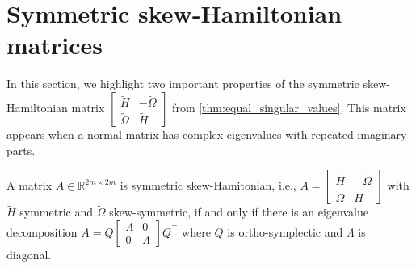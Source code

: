 \documentclass[10pt,twoside,dvipsnames]{siamart1116}
\numberwithin{algorithm}{section}
\numberwithin{equation}{section}
\begin{document}
	\section{Symmetric skew-Hamiltonian matrices}\label{app:sym_skew_hamiltonian} In this section, we highlight two important properties of the symmetric skew-Hamiltonian matrix $\left[\begin{smallmatrix}
	\widetilde{H}&-\widetilde{\Omega}\\
	\widetilde{\Omega}&\widetilde{H}
	\end{smallmatrix}\right]$ from \cref{thm:equal_singular_values}. This matrix appears when a normal matrix has complex eigenvalues with repeated imaginary parts.
	\begin{lemma}\label{lem:symplectic_vectors}
	A matrix $A\in\mathbb{R}^{2m\times 2m}$ is symmetric skew-Hamitonian, i.e., $A=\left[\begin{smallmatrix}
	\widetilde{H}&-\widetilde{\Omega}\\
	\widetilde{\Omega}&\widetilde{H}
	\end{smallmatrix}\right]$ with $\widetilde{H}$ symmetric and $\widetilde{\Omega}$ skew-symmetric, if and only if there is an eigenvalue decomposition $A=Q\left[\begin{smallmatrix}
	\Lambda&0\\
	0&\Lambda
	\end{smallmatrix}\right]Q^\top $ where $Q$ is ortho-symplectic and $\Lambda$ is diagonal.
	\end{lemma}
\end{document}
